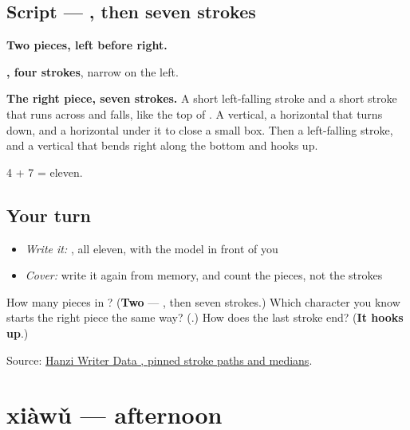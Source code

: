 \subsection*{Script — , then seven strokes}

\begin{quote}
\end{quote}

\textbf{Two pieces, left before right.}

\textbf{, four strokes}, narrow on the left.

\textbf{The right piece, seven strokes.} A short left-falling stroke and a short stroke that runs across and falls, like the top of . A vertical, a horizontal that turns down, and a horizontal under it to close a small box. Then a left-falling stroke, and a vertical that bends right along the bottom and hooks up.

4 + 7 = eleven.

\subsection*{Your turn}
\begin{itemize}
\raggedright
  \item \emph{Write it:} , all eleven, with the model in front of you
  \item \emph{Cover:} write it again from memory, and count the pieces, not the strokes
\end{itemize}

\begin{tcolorbox}[breakable,colback=teal!4,colframe=teal!35!black,title={Before you move on}]
How many pieces in ? (\textbf{Two} — , then seven strokes.) Which character you know starts the right piece the same way? (\textbf{}.) How does the last stroke end? (\textbf{It hooks up}.)

Source: \href{https://raw.githubusercontent.com/chanind/hanzi-writer-data/68d10a4b21150cae5e1ebbd223eed289cf32d90c/data/\%E6\%99\%9A.json}{Hanzi Writer Data , pinned stroke paths and medians}.
\end{tcolorbox}
\section[xiàwǔ]{xiàwǔ — afternoon}

\label{lesson:ZH-C49-xiawu}



